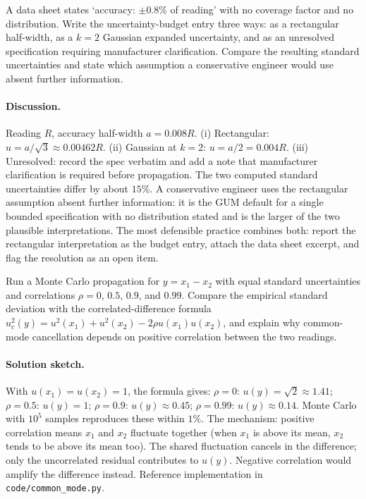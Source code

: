 \begin{exercise}
A data sheet states `accuracy: $\pm 0.8\%$ of reading' with no
coverage factor and no distribution. Write the uncertainty-budget
entry three ways: as a rectangular half-width, as a $k = 2$ Gaussian
expanded uncertainty, and as an unresolved specification requiring
manufacturer clarification. Compare the resulting standard
uncertainties and state which assumption a conservative engineer
would use absent further information.
\end{exercise}

\paragraph{Discussion.}
Reading $R$, accuracy half-width $a = 0.008 R$. (i) Rectangular:
$u = a/\sqrt{3} \approx 0.00462 R$. (ii) Gaussian at $k = 2$:
$u = a/2 = 0.004 R$. (iii) Unresolved: record the spec verbatim
and add a note that manufacturer clarification is required
before propagation. The two computed standard uncertainties
differ by about $15\%$. A conservative engineer uses the
rectangular assumption absent further information: it is the GUM
default for a single bounded specification with no distribution
stated \cite{std:iso-iec-guide98} and is the larger of the two
plausible interpretations. The most defensible practice combines
both: report the rectangular interpretation as the budget entry,
attach the data sheet excerpt, and flag the resolution as an
open item.

\begin{exercise}
Run a Monte Carlo propagation for $y = x_{1} - x_{2}$ with equal
standard uncertainties and correlations $\rho = 0$, $0.5$, $0.9$,
and $0.99$. Compare the empirical standard deviation with the
correlated-difference formula
$u_{c}^{2}(y) = u^{2}(x_{1}) + u^{2}(x_{2}) - 2\rho u(x_{1})
u(x_{2})$, and explain why common-mode cancellation depends on
positive correlation between the two readings.
\end{exercise}

\paragraph{Solution sketch.}
With $u(x_{1}) = u(x_{2}) = 1$, the formula gives:
$\rho = 0$: $u(y) = \sqrt{2} \approx 1.41$;
$\rho = 0.5$: $u(y) = 1$;
$\rho = 0.9$: $u(y) \approx 0.45$;
$\rho = 0.99$: $u(y) \approx 0.14$. Monte Carlo with $10^{5}$
samples reproduces these within $1\%$. The mechanism: positive
correlation means $x_{1}$ and $x_{2}$ fluctuate together (when
$x_{1}$ is above its mean, $x_{2}$ tends to be above its mean
too). The shared fluctuation cancels in the difference; only the
uncorrelated residual contributes to $u(y)$. Negative correlation
would amplify the difference instead. Reference implementation in
\texttt{code/common\_mode.py}.
